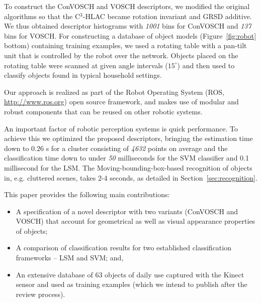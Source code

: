 \documentclass[a4paper, 10 pt, conference]{sty/ieeeconf}
\begin{document}
To construct the ConVOSCH and VOSCH descriptors, we modified the original algorithms
so that the C$^3$-HLAC became rotation invariant and GRSD 
additive. We thus obtained descriptor histograms with 
\emph{1001} bins for ConVOSCH and \emph{137} bins for VOSCH. %
For constructing a database of object models (Figure~\ref{fig:robot} bottom)
containing training examples, we used a rotating
table with a pan-tilt unit that is controlled by the robot over the
network. Objects placed on the rotating table were scanned at given
angle intervals ($15^\circ$) and then used to classify objects found in
typical household settings.

Our approach is realized as part of the Robot Operating System
(ROS, \url{http://www.ros.org}) open source framework, and makes
use of modular and robust components that can be reused on other robotic
systems.

An important factor of robotic perception systems is quick performance. To achieve this we optimized
the proposed descriptors, bringing the estimation time down to $0.26$ s for a cluster consisting of 
\emph{4632} points on average and the classification time down to under \emph{50} milliseconds
for the SVM classifier and 0.1 millisecond for the LSM. The Moving-bounding-box-based
recognition of objects in, e.g. cluttered scenes, takes 2-4 seconds, as detailed
in Section~\ref{sec:recognition}.

This paper provides the following main contributions:
\begin{itemize}
\item A specification of a novel descriptor with two variants (ConVOSCH and VOSCH) that account for
geometrical as well as visual appearance  properties of objects;
\item A comparison of classification results for two established classification
frameworks -- LSM and SVM; and,
\item An extensive database of 63 objects of daily use captured with the Kinect sensor
and used as training examples (which we intend to publish after the review process).
\end{itemize}
\end{document}
